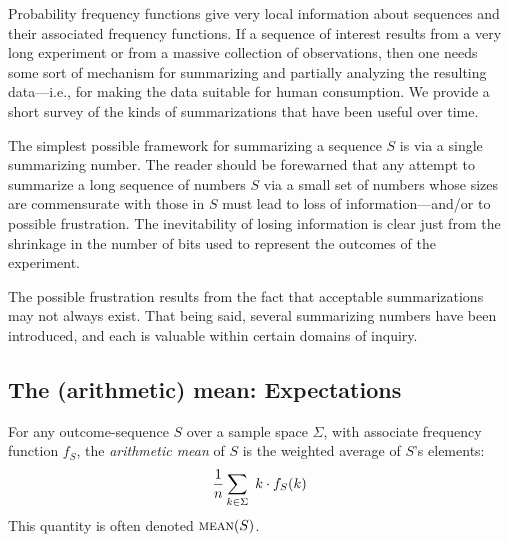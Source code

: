 \bigskip

Probability frequency functions give very local information about sequences and their associated frequency functions.  If a sequence of interest results from a very long experiment or from a massive collection of observations, then one needs some sort of mechanism for summarizing and partially analyzing the resulting data---i.e., for making the data suitable for human consumption.  We provide a short survey of the kinds of summarizations that have been useful over time.

\medskip

The simplest possible framework for summarizing a sequence $S$ is via a single summarizing number. The reader should be forewarned that any attempt to summarize a long sequence of numbers $S$ via a small set of numbers whose sizes are commensurate with those in $S$ must lead to loss of information---and/or to possible frustration.  The inevitability of losing information is clear just from the shrinkage in the number of bits used to represent the outcomes of the experiment.

\bigskip

\noindent {}

\bigskip

\noindent
The possible frustration results from the fact that acceptable summarizations may not
always exist.   That being said, several summarizing numbers have been introduced, and
each is valuable within certain domains of inquiry. 

\subsection{The (arithmetic) mean: Expectations}
\label{sec:mean}

   
For any outcome-sequence $S$ over a sample space $\Sigma$, with associate frequency function $f_S$, the {\it arithmetic mean} of $S$ is the weighted average of $S$'s elements:
\[ {1 \over n} \sum_{k \in \Sigma} \ k \cdot f_S(k) \]
This quantity is often denoted $\mbox{\sc mean}(S)$.  

